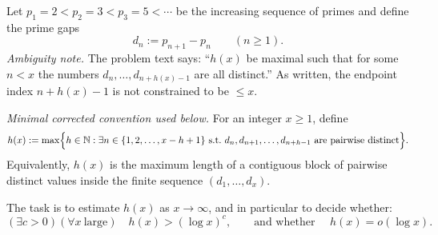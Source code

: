 Let $p_1=2<p_2=3<p_3=5<\cdots$ be the increasing sequence of primes and define the prime gaps
\[
  d_n := p_{n+1}-p_n \qquad (n\ge 1).
\]
\emph{Ambiguity note.} The problem text says: ``$h(x)$ be maximal such that for some $n<x$ the numbers $d_n,\ldots,d_{n+h(x)-1}$ are all distinct.''  As written, the endpoint index $n+h(x)-1$ is not constrained to be $\le x$.

\emph{Minimal corrected convention used below.} For an integer $x\ge 1$, define
\[
  h(x) := \max\Bigl\{h\in\mathbb{N}: \exists n\in\{1,2,\dots,x-h+1\}\ \text{s.t.}\ d_n,d_{n+1},\dots,d_{n+h-1}\ \text{are pairwise distinct}\Bigr\}.
\]
Equivalently, $h(x)$ is the maximum length of a contiguous block of pairwise distinct values inside the finite sequence $(d_1,\dots,d_x)$.

The task is to estimate $h(x)$ as $x\to\infty$, and in particular to decide whether:
\[
  (\exists c>0)(\forall x\ \text{large})\quad h(x)>(\log x)^c,\qquad\text{and whether }\quad h(x)=o(\log x).
\]
